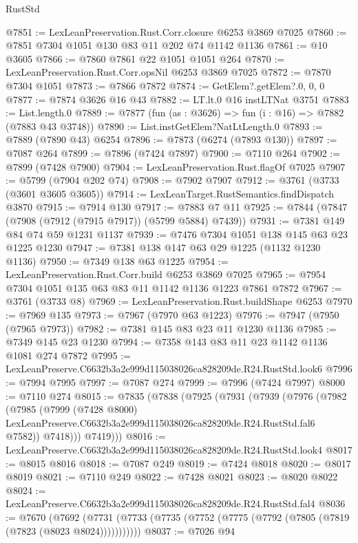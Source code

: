 \begin{lexlean}{RustStd}
\begin{coremodule}
@7851 := LexLeanPreservation.Rust.Corr.closure @6253 @3869 @7025
@7860 := @7851 @7304 @1051 @130 @83 @11 @202 @74 @1142 @1136
@7861 := @10 @3605
@7866 := @7860 @7861 @22 @1051 @1051 @264
@7870 := LexLeanPreservation.Rust.Corr.opsNil @6253 @3869 @7025
@7872 := @7870 @7304 @1051
@7873 := @7866 @7872
@7874 := GetElem?.getElem?.{0, 0, 0}
@7877 := @7874 @3626 @16 @43
@7882 := LT.lt.{0} @16 instLTNat @3751
@7883 := List.length.{0}
@7889 := @7877 (fun (as : @3626) => fun (i : @16) => @7882 (@7883 @43 @3748))
@7890 := List.instGetElem?NatLtLength.{0}
@7893 := @7889 (@7890 @43) @6254
@7896 := @7873 (@6274 (@7893 @130))
@7897 := @7087 @264
@7899 := @7896 (@7424 @7897)
@7900 := @7110 @264
@7902 := @7899 (@7428 @7900)
@7904 := LexLeanPreservation.Rust.flagOf @7025
@7907 := @5799 (@7904 @202 @74)
@7908 := @7902 @7907
@7912 := @3761 (@3733 (@3601 @3605 @3605))
@7914 := LexLeanTarget.RustSemantics.findDispatch @3870
@7915 := @7914 @130
@7917 := @7883 @7 @11
@7925 := @7844 (@7847 (@7908 (@7912 (@7915 @7917)) (@5799 @5884) @7439))
@7931 := @7381 @149 @84 @74 @59 @1231 @1137
@7939 := @7476 @7304 @1051 @138 @145 @63 @23 @1225 @1230
@7947 := @7381 @138 @147 @63 @29 @1225 (@1132 @1230 @1136)
@7950 := @7349 @138 @63 @1225
@7954 := LexLeanPreservation.Rust.Corr.build @6253 @3869 @7025
@7965 := @7954 @7304 @1051 @135 @63 @83 @11 @1142 @1136 @1223 @7861 @7872
@7967 := @3761 (@3733 @8)
@7969 := LexLeanPreservation.Rust.buildShape @6253
@7970 := @7969 @135
@7973 := @7967 (@7970 @63 @1223)
@7976 := @7947 (@7950 (@7965 @7973))
@7982 := @7381 @145 @83 @23 @11 @1230 @1136
@7985 := @7349 @145 @23 @1230
@7994 := @7358 @143 @83 @11 @23 @1142 @1136 @1081 @274 @7872
@7995 := LexLeanPreserve.C6632b3a2e999d115038026ca828209de.R24.RustStd.look6
@7996 := @7994 @7995
@7997 := @7087 @274
@7999 := @7996 (@7424 @7997)
@8000 := @7110 @274
@8015 := @7835
    (@7838
      (@7925
        (@7931
          (@7939
            (@7976
              (@7982
                (@7985
                  (@7999
                    (@7428 @8000)
                    LexLeanPreserve.C6632b3a2e999d115038026ca828209de.R24.RustStd.fal6
                    @7582))
                @7418)))
          @7419)))
@8016 := LexLeanPreserve.C6632b3a2e999d115038026ca828209de.R24.RustStd.look4
@8017 := @8015 @8016
@8018 := @7087 @249
@8019 := @7424 @8018
@8020 := @8017 @8019
@8021 := @7110 @249
@8022 := @7428 @8021
@8023 := @8020 @8022
@8024 := LexLeanPreserve.C6632b3a2e999d115038026ca828209de.R24.RustStd.fal4
@8036 := @7670
    (@7692 (@7731 (@7733 (@7735 (@7752 (@7775 (@7792 (@7805 (@7819 (@7823 (@8023 @8024)))))))))))
@8037 := @7026 @94

\end{coremodule}
\end{lexlean}
